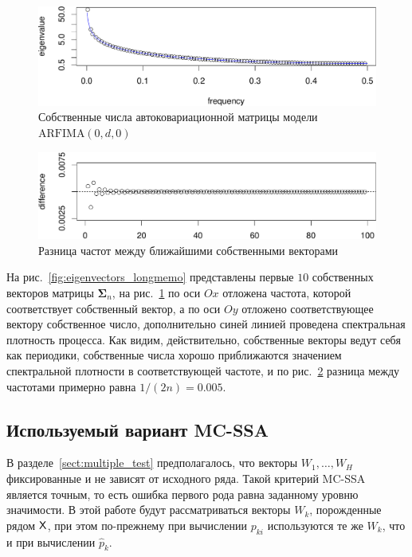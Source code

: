 \documentclass[specialist,
substylefile = spbu_report.rtx,
subf,href,colorlinks=true, 12pt]{disser}
\theoremstyle{definition}
\newtheorem{remark}{Замечание}[chapter]
\begin{document}
\begin{figure}[h]
	\includegraphics[width=\textwidth]{img/eigenvalues_longmemo.pdf}
	\caption{Собственные числа автоковариационной матрицы модели $\mathrm{ARFIMA}(0, d, 0)$}
	\label{fig:eigenvalues_longmemo}
\end{figure}

\begin{figure}[h]
	\includegraphics[width=\textwidth]{img/eigenvectors_freq_diff.pdf}
	\caption{Разница частот между ближайшими собственными векторами}
	\label{fig:freq_diff}
\end{figure}

На рис.~\ref{fig:eigenvectors_longmemo} представлены первые $10$ собственных векторов матрицы $\bm\Sigma_n$, на рис.~\ref{fig:eigenvalues_longmemo} по оси $Ox$ отложена частота, которой соответствует собственный вектор, а по оси $Oy$ отложено соответствующее вектору собственное число, дополнительно синей линией проведена спектральная плотность процесса. Как видим, действительно, собственные векторы ведут себя как периодики, собственные числа хорошо приближаются значением спектральной плотности в соответствующей частоте, и по рис.~\ref{fig:freq_diff} разница между частотами примерно равна $1 / (2n)=0.005$.

\subsection{Используемый вариант MC-SSA}\label{sect:vectors_choise}
В разделе~\ref{sect:multiple_test} предполагалось, что векторы $W_1,\ldots, W_H$ фиксированные и не зависят от исходного ряда. Такой критерий MC-SSA является точным, то есть ошибка первого рода равна заданному уровню значимости. В этой работе будут рассматриваться векторы $W_k$, порожденные рядом $\mathsf{X}$, при этом по-прежнему при вычислении $p_{ki}$ используются те же $W_k$, что и при вычислении $\widehat p_k$.
\end{document}
